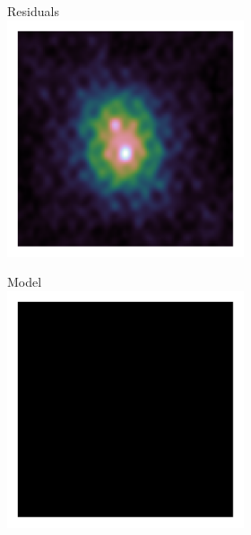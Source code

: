 \begin{figure}[h]
	\centering
	\begin{subfigure}[b]{0.48\linewidth}
		\begin{subfigure}[b]{0.48\linewidth}
			\centering
			Residuals\\
			\includegraphics[width=1.0\linewidth, clip, trim= 1.0in 1.0in 1.0in 1.0in]{./chapters/01.intro/cleanExample/dirty_CLEAN_0.png}
		\end{subfigure}
			\begin{subfigure}[b]{0.48\linewidth}
			\centering
			Model\\
			\includegraphics[width=1.0\linewidth, clip, trim= 1.0in 1.0in 1.0in 1.0in]{./chapters/01.intro/cleanExample/model_CLEAN_0.png}

\end{subfigure}
\end{subfigure}
\end{figure}
